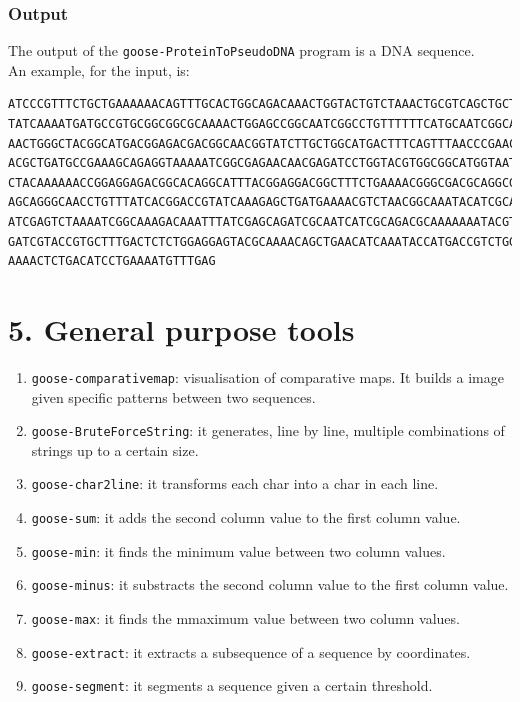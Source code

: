\documentclass[11pt,journal,compsoc]{report}[1]
\begin{document}
\subsection*{Output}

The output of the \texttt{goose-ProteinToPseudoDNA} program is a DNA sequence.\\
An example, for the input, is:
\begin{lstlisting}
ATCCCGTTTCTGCTGAAAAAACAGTTTGCACTGGCAGACAAACTGGTACTGTCTAAACTGCGTCAGCTGCTGGGCGGCCG
TATCAAAATGATGCCGTGCGGCGGCGCAAAACTGGAGCCGGCAATCGGCCTGTTTTTTCATGCAATCGGCATCAACATCA
AACTGGGCTACGGCATGACGGAGACGACGGCAACGGTATCTTGCTGGCATGACTTTCAGTTTAACCCGAACTCTATCGGC
ACGCTGATGCCGAAAGCAGAGGTAAAAATCGGCGAGAACAACGAGATCCTGGTACGTGGCGGCATGGTAATGAAAGGCTA
CTACAAAAAACCGGAGGAGACGGCACAGGCATTTACGGAGGACGGCTTTCTGAAAACGGGCGACGCAGGCGAGTTTGACG
AGCAGGGCAACCTGTTTATCACGGACCGTATCAAAGAGCTGATGAAAACGTCTAACGGCAAATACATCGCACCGCAGTAC
ATCGAGTCTAAAATCGGCAAAGACAAATTTATCGAGCAGATCGCAATCATCGCAGACGCAAAAAAATACGTATCTGCACT
GATCGTACCGTGCTTTGACTCTCTGGAGGAGTACGCAAAACAGCTGAACATCAAATACCATGACCGTCTGGAGCTGCTGA
AAAACTCTGACATCCTGAAAATGTTTGAG
\end{lstlisting}



\chapter*{5. General purpose tools}
\label{seq}

\begin{enumerate}
\item \texttt{goose-comparativemap}: visualisation of comparative maps. It builds a image given specific patterns between two sequences.
\item \texttt{goose-BruteForceString}: it generates, line by line, multiple combinations of strings up to a certain size.
\item \texttt{goose-char2line}: it transforms each char into a char in each line.
\item \texttt{goose-sum}: it adds the second column value to the first column value.
\item \texttt{goose-min}: it finds the minimum value between two column values.
\item \texttt{goose-minus}: it substracts the second column value to the first column value.
\item \texttt{goose-max}: it finds the mmaximum value between two column values.
\item \texttt{goose-extract}: it extracts a subsequence of a sequence by coordinates.
\item \texttt{goose-segment}: it segments a sequence given a certain threshold.
\end{enumerate}







\end{document}
